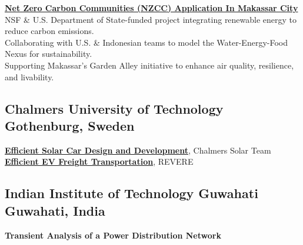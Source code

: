\documentclass[]{Keval-resume}
\begin{document}
{{\href{https://sites.psu.edu/sbslab/research/city/net-zero-carbon-community-nzcc/}{\textbf{Net Zero Carbon Communities (NZCC) Application In Makassar City}}\\
\hspace{1.5em} \textbullet{} NSF \& U.S. Department of State-funded project integrating renewable energy to reduce carbon emissions.\\
\hspace{1.5em} \textbullet{} Collaborating with U.S. \& Indonesian teams to model the Water-Energy-Food Nexus for sustainability.\\
\hspace{1.5em} \textbullet{} Supporting Makassar’s Garden Alley initiative to enhance air quality, resilience, and livability.\\



\sectionsep

\subsection{Chalmers University of Technology \hfill \normalfont G\lowercase{othenburg,}  Sweden}

\hspace{1.5em} \textbullet{} \href{https://www.chalmerssolarteam.com}{\textbf{Efficient Solar Car Design and Development}}, Chalmers Solar Team\\
\hspace{1.5em} \textbullet{} \href{https://www.chalmers.se/en/infrastructure/revere/}{\textbf{Efficient EV Freight Transportation}}, REVERE\\

\sectionsep

\subsection{Indian Institute of Technology Guwahati \hfill \normalfont G\lowercase{uwahati,}  India}

\hspace{1.5em} \textbullet{} \textbf{Transient Analysis of a Power Distribution Network}\\

\sectionsep

}}
\end{document}
